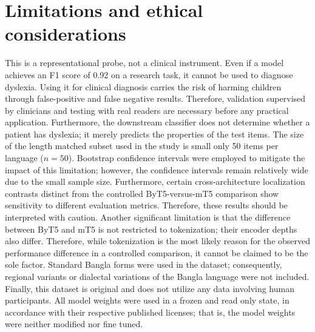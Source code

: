 \documentclass[preprint,12pt,authoryear]{elsarticle}
\begin{document}
\section{Limitations and ethical considerations}
\label{sec:limits}
This is a representational probe, not a clinical instrument. Even if a model achieves an F1 score of 0.92 on a research task, it cannot be used to diagnose dyslexia. Using it for clinical diagnosis carries the risk of harming children through false-positive and false negative results. Therefore, validation supervised by clinicians and testing with real readers are necessary before any practical application. Furthermore, the downstream classifier does not determine whether a patient has dyslexia; it merely predicts the properties of the test items. The size of the length matched subset used in the study is small only 50 items per language ($n = 50$). Bootstrap confidence intervals were employed to mitigate the impact of this limitation; however, the confidence intervals remain relatively wide due to the small sample size. Furthermore, certain cross-architecture localization contrasts distinct from the controlled ByT5-versus-mT5 comparison show sensitivity to different evaluation metrics. Therefore, these results should be interpreted with caution. Another significant limitation is that the difference between ByT5 and mT5 is not restricted to tokenization; their encoder depths also differ. Therefore, while tokenization is the most likely reason for the observed performance difference in a controlled comparison, it cannot be claimed to be the sole factor. Standard Bangla forms were used in the dataset; consequently, regional variants or dialectal variations of the Bangla language were not included. Finally, this dataset is original and does not utilize any data involving human participants. All model weights were used in a frozen and read only state, in accordance with their respective published licenses; that is, the model weights were neither modified nor fine tuned.

\end{document}
